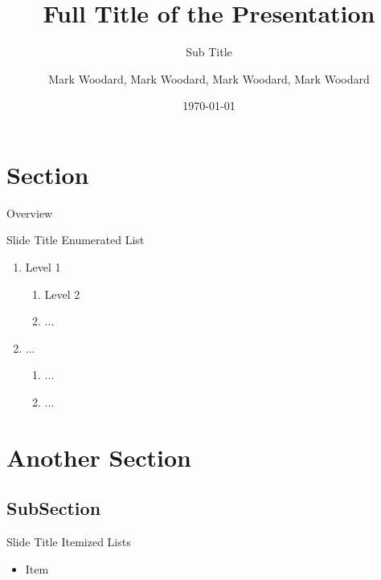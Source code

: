 \usepackage[english] {babel}

\usepackage{amsmath, amsfonts, graphicx}
\usepackage{bibunits, tikz}


\title[Short Title]{Full Title of the Presentation}
\subtitle{Sub Title}
\author[Mark Woodard]{Mark Woodard, Mark Woodard, Mark Woodard, Mark Woodard}
\date{\today}


\maketitle

\section{Section}
\begin{frame}{Overview}
  \tableofcontents
\end{frame}

\begin{frame}{Slide Title}
  Enumerated List~\cite{ipsum}\pause
  \begin{enumerate}
  \item Level 1
    \begin{enumerate}
    \item Level 2
    \item ...
    \end{enumerate}\pause
  \item ...
    \begin{enumerate}
    \item ...
    \item ...
    \end{enumerate}
  \end{enumerate}
\end{frame}

\section{Another Section}
\subsection{SubSection}
\begin{frame}{Slide Title}
  Itemized Lists~\cite{lorem}
  \begin{itemize}
  \item Item
  \end{itemize}
\end{frame}

